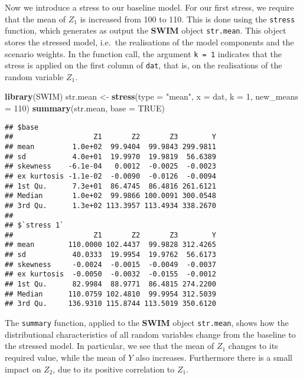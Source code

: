 \documentclass[
]{article}
\newenvironment{Shaded}{\begin{snugshade}}{\end{snugshade}}
\newcommand{\DataTypeTok}[1]{\textcolor[rgb]{0.13,0.29,0.53}{#1}}
\newcommand{\DecValTok}[1]{\textcolor[rgb]{0.00,0.00,0.81}{#1}}
\newcommand{\KeywordTok}[1]{\textcolor[rgb]{0.13,0.29,0.53}{\textbf{#1}}}
\newcommand{\NormalTok}[1]{#1}
\newcommand{\OtherTok}[1]{\textcolor[rgb]{0.56,0.35,0.01}{#1}}
\newcommand{\StringTok}[1]{\textcolor[rgb]{0.31,0.60,0.02}{#1}}
\begin{document}
Now we introduce a stress to our baseline model. For our first stress, we require that the mean of \(Z_1\) is increased from 100 to 110. This is done using the \texttt{stress} function, which generates as output the \textbf{SWIM} object \texttt{str.mean}. This object stores the stressed model, i.e.~the realisations of the model components and the scenario weights. In the function call, the argument \texttt{k\ =\ 1} indicates that the stress is applied on the first column of \texttt{dat}, that is, on the realisations of the random variable \(Z_1\).

\begin{Shaded}
\begin{Highlighting}[]
\KeywordTok{library}\NormalTok{(SWIM)}
\NormalTok{str.mean \textless{}{-}}\StringTok{ }\KeywordTok{stress}\NormalTok{(}\DataTypeTok{type =} \StringTok{"mean"}\NormalTok{, }\DataTypeTok{x =}\NormalTok{ dat, }\DataTypeTok{k =} \DecValTok{1}\NormalTok{, }\DataTypeTok{new\_means =} \DecValTok{110}\NormalTok{)}
\KeywordTok{summary}\NormalTok{(str.mean, }\DataTypeTok{base =} \OtherTok{TRUE}\NormalTok{)}
\end{Highlighting}
\end{Shaded}

\begin{verbatim}
## $base
##                   Z1       Z2       Z3        Y
## mean         1.0e+02  99.9404  99.9843 299.9811
## sd           4.0e+01  19.9970  19.9819  56.6389
## skewness    -6.1e-04   0.0012  -0.0025  -0.0023
## ex kurtosis -1.1e-02  -0.0090  -0.0126  -0.0094
## 1st Qu.      7.3e+01  86.4745  86.4816 261.6121
## Median       1.0e+02  99.9866 100.0091 300.0548
## 3rd Qu.      1.3e+02 113.3957 113.4934 338.2670
## 
## $`stress 1`
##                   Z1       Z2       Z3        Y
## mean        110.0000 102.4437  99.9828 312.4265
## sd           40.0333  19.9954  19.9762  56.6173
## skewness     -0.0024  -0.0015  -0.0049  -0.0037
## ex kurtosis  -0.0050  -0.0032  -0.0155  -0.0012
## 1st Qu.      82.9984  88.9771  86.4815 274.2200
## Median      110.0759 102.4810  99.9954 312.5039
## 3rd Qu.     136.9310 115.8744 113.5019 350.6120
\end{verbatim}

The \texttt{summary} function, applied to the \textbf{SWIM} object \texttt{str.mean}, shows how the distributional characteristics of all random variables change from the baseline to the stressed model. In particular, we see that the mean of \(Z_1\) changes to its required value, while the mean of \(Y\) also increases. Furthermore there is a small impact on \(Z_2\), due to its positive correlation to \(Z_1\).
\end{document}
